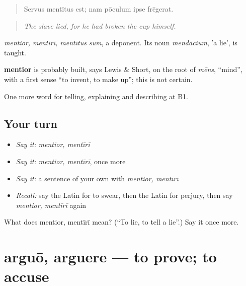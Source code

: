 \begin{quote}
Servus mentītus est; nam pōculum ipse frēgerat.
\end{quote}

\begin{quote}
\emph{The slave lied, for he had broken the cup himself.}
\end{quote}

\emph{mentior, mentīrī, mentītus sum}, a deponent. Its noun \emph{mendācium}, 'a lie', is taught.

\begin{cousinweb}
\textbf{mentior} is probably built, says Lewis \& Short, on the root of \emph{mēns}, \textquotedblleft{}mind\textquotedblright{}, with a first sense \textquotedblleft{}to invent, to make up\textquotedblright{}; this is not certain.
\end{cousinweb}

\begin{grammarlens}[title={What you've built}]
One more word for telling, explaining and describing at B1.
\end{grammarlens}

\subsection*{Your turn}
\begin{itemize}
\raggedright
  \item \emph{Say it:} \emph{mentior, mentīrī}
  \item \emph{Say it:} \emph{mentior, mentīrī}, once more
  \item \emph{Say it:} a sentence of your own with \emph{mentior, mentīrī}
  \item \emph{Recall:} say the Latin for to swear, then the Latin for perjury, then say \emph{mentior, mentīrī} again
\end{itemize}

\begin{tcolorbox}[breakable,colback=teal!4,colframe=teal!35!black,title={Before you move on}]
What does mentior, mentīrī mean? (\textquotedblleft{}To lie, to tell a lie\textquotedblright{}.) Say it once more.
\end{tcolorbox}
\section[arguō, arguere]{arguō, arguere — to prove; to accuse}

\label{lesson:LA-C310-arguo}



